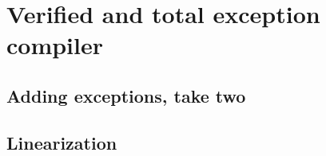 \chapter{Verified and total exception compiler}

\section{Adding exceptions, take two}

\section{Linearization}
